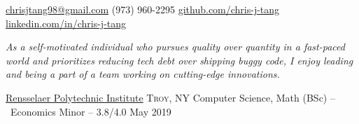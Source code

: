 \documentclass[10pt,a4paper]{article}
\begin{document}
\sloppy  %



\nobreakvspace{0.3em}  %

\noindent\href{mailto:chrisjtang98.at.gmail.dot.com}{chrisjtang98\mbox{}@\mbox{}gmail.com}\sbull
\textsmaller(973) 960-2295\sbull
\href{https://github.com/chris-j-tang}{github.com/chris-j-tang}\sbull
\href{https://www.linkedin.com/in/chris-j-tang/}{linkedin.com/in/chris-j-tang}

\spacedhrule{0.9em}{-0.4em}  %


\vspace{-1.8em}  %
{\bodytext \noindent \emph{As a self-motivated individual who pursues quality over quantity in a fast-paced world and prioritizes reducing tech debt over shipping buggy code, I enjoy leading and being a part of a team working on cutting-edge innovations. }}

\vspace{0.5em}
\spacedhrule{0em}{-0.4em}


\headedsection
  {\href{http://rpi.edu/}{Rensselaer Polytechnic Institute}}
  {\textsc{Troy, NY}} {%
  \headedsubsection
    {Computer Science, Math (BSc) -- \textnormal{~Economics Minor} -- 3.8/4.0}
    {May 2019} {\\}
}

\spacedhrule{0em}{-0.4em}

\end{document}
